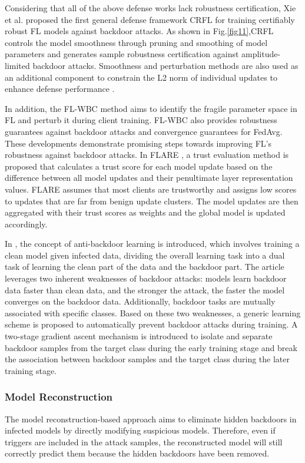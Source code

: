 \documentclass[conference]{IEEEtran}
\begin{document}
Considering that all of the above defense works lack robustness certification,
Xie et al. \cite{b86} proposed the first general defense framework CRFL for training certifiably robust FL models against backdoor attacks.
As shown in Fig.\ref{fig11},CRFL controls the model smoothness through pruning and smoothing of model parameters and generates sample robustness
certification against amplitude-limited backdoor attacks. Smoothness and perturbation methods are also used as an
additional component to constrain the L2 norm of individual updates to enhance defense performance \cite{b87}.

In addition, the FL-WBC \cite{b88} method aims to identify the fragile parameter space in FL and perturb it
during client training. FL-WBC also provides robustness guarantees against backdoor attacks and convergence guarantees for FedAvg.
These developments demonstrate promising steps towards improving FL's robustness against backdoor attacks. In FLARE \cite{b89}, a trust
evaluation method is proposed that calculates a trust score for each model update based on the difference between all model updates and
their penultimate layer representation values. FLARE assumes that most clients are trustworthy and assigns low scores
to updates that are far from benign update clusters. The model updates are then aggregated with their trust scores as
weights and the global model is updated accordingly.

In \cite{b98}, the concept of anti-backdoor learning is introduced, which involves training a clean model given infected data,
dividing the overall learning task into a dual task of learning the clean part of the data and the backdoor part.
The article leverages two inherent weaknesses of backdoor attacks: models learn backdoor data faster than clean data,
and the stronger the attack, the faster the model converges on the backdoor data. Additionally, backdoor tasks are mutually
associated with specific classes. Based on these two weaknesses, a generic learning scheme is proposed to automatically prevent
backdoor attacks during training. A two-stage gradient ascent mechanism is introduced to isolate and separate backdoor samples
from the target class during the early training stage and break the association between backdoor samples and the target class during the later training stage.
\subsubsection{Model Reconstruction}
The model reconstruction-based approach aims to eliminate hidden backdoors in infected models by directly modifying suspicious models.
Therefore, even if triggers are included in the attack samples, the reconstructed model will still correctly predict them because
the hidden backdoors have been removed.
\end{document}
